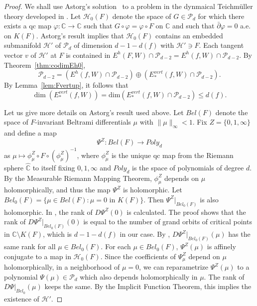 \documentclass{amsart}
\numberwithin{equation}{section}
\theoremstyle{definition}
\theoremstyle{remark}
\begin{document}
\begin{proof} We shall use Astorg's solution~\cite{Astorg} to a problem in the dynmaical Teichm\"uller theory developed in \cite{McS}. Let 
$\mathcal{H}_0(F)$ denote the space of $G\in \mathcal{P}_d$ for which there exists a qc map $\varphi:\mathbb{C}\to\mathbb{C}$ such that $G\circ \varphi=\varphi\circ F$ on $\mathbb{C}$ and such that $\bar{\partial }\varphi=0$ a.e. on $K(F)$. Astorg's result implies that $\mathcal{H}_0(F)$ contains an embedded  submanifold $\mathcal{H}'$ of $\mathcal{P}_d$ of dimension $d-1-d(f)$ with $\mathcal{H}'\ni F$. Each tangent vector $v$ of $\mathcal{H}'$ at $F$ is contained in  $E^h(F, W)\cap \mathcal{P}_{d-2}=E^h(f,W)\cap \mathcal{P}_{d-2}$. By Theorem~\ref{thm:codimEh0},
$$\mathcal{P}_{d-2}= (E^h(f,W)\cap\mathcal{P}_{d-2})\oplus(E^{vert}_*(f,W)\cap\mathcal{P}_{d-2}).$$
By Lemma~\ref{lem:Fvertup}, it follows that 
 $$\dim(E^{vert}_*(f,W))=\text{dim}(E^{vert}_*(f,W)\cap\mathcal{P}_{d-2})\le d(f).$$  

Let us give more details on Astorg's result used above. Let $Bel(F)$ denote the space of $F$-invariant Beltrami differentials $\mu$ with $\|\mu\|_\infty<1$. Fix $Z=\{0,1,\infty\}$ and define a map 
$$\Psi^Z: Bel(F)\to Poly_d$$ as $\mu\mapsto \phi^Z_\mu\circ F\circ (\phi^Z_\mu)^{-1}$, where $\phi^Z_\mu$ is the unique qc map from the Riemann sphere $\widehat{\mathbb{C}}$ to itself fixing $0,1,\infty$ and $Poly_d$ is the space of polynomials of degree $d$. By the Measurable Riemann Mapping Theorem, $\phi^Z_\mu$ depends on $\mu$ holomorphically, and thus the map $\Psi^Z$ is holomorphic. Let $Bel_0(F)=\{\mu\in Bel(F):\mu=0 \mbox{ in } K(F)\}$. Then $\Psi^Z|_{Bel_0(F)}$ is also holomorphic. In \cite[Theorem 4.5]{Astorg}, the rank of $D\Psi^Z(0)$ is calculated. The proof shows that the rank of $D\Psi^Z|_{Bel_0(F)}(0)$ is equal to the number of grand orbits of critical points in $\mathbb{C}\setminus K(F)$, which is $d-1-d(f)$ in our case. By \cite[Proposition 7]{Astorg}, $D\Psi^Z|_{Bel_0(F)}(\mu)$ has the same rank for all $\mu\in Bel_0(F)$. For each $\mu\in Bel_0(F)$, $\Psi^Z(\mu)$ is affinely conjugate to a map in $\mathcal{H}_0(F)$. Since the coefficients of $\Psi^Z_\mu$ depend on $\mu$ holomorphically, in a neighborhood of $\mu=0$, we can reparametrize $\Psi^Z(\mu)$ to a polynomial $\Psi(\mu)\in \mathcal{P}_d$ which also depends holomorphically in $\mu$. The rank of $D\Psi|_{Bel_0}(\mu)$ keeps the same. By the Implicit Function Theorem, this implies the existence of $\mathcal{H}'$.       
\end{proof}
\end{document}
